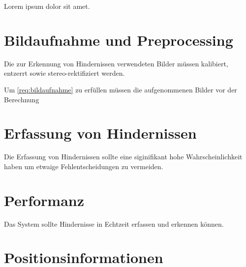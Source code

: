 Lorem ipsum dolor sit amet.

\section{Bildaufnahme und Preprocessing}
\label{sec:bildaufnahme_preprocessing}

	\begin{anforderung}
	\label{req:bildaufnahme}
		Die zur Erkennung von Hindernissen verwendeten Bilder müssen kalibiert, entzerrt sowie stereo-rektifiziert werden.
	\end{anforderung}
	
Um \ref{req:bildaufnahme} zu erfüllen müssen die aufgenommenen Bilder vor der Berechnung 

\section{Erfassung von Hindernissen}
\label{sec:erfassung_von_hindernissen}

	\begin{anforderung}
	\label{req:erfassung_von_hindernissen}
		Die Erfassung von Hindernissen sollte eine siginifikant hohe Wahrscheinlichkeit haben um etwaige Fehlentscheidungen zu vermeiden.
	\end{anforderung}

\section{Performanz}
\label{sec:performanz}

	\begin{anforderung}
	\label{req:performanz}
		Das System sollte Hindernisse in Echtzeit erfassen und erkennen können.
	\end{anforderung}

\section{Positionsinformationen}
\label{sec:positionsinformationen}

	\begin{anforderung}
	\label{req:positionsinformationen}
		
	\end{anforderung}
